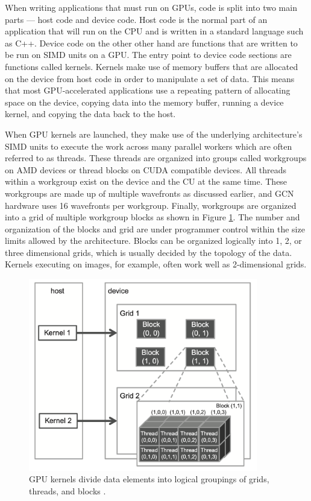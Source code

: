 When writing applications that must run on GPUs, code is split into two main parts — host code and device code. Host code is the normal part of an application that will run on the CPU and is written in a standard language such as C++. Device code on the other other hand are functions that are written to be run on SIMD units on a GPU. The entry point to device code sections are functions called kernels. Kernels make use of memory buffers that are allocated on the device from host code in order to manipulate a set of data. This means that most GPU-accelerated applications use a repeating pattern of allocating space on the device, copying data into the memory buffer, running a device kernel, and copying the data back to the host. 

\quad When GPU kernels are launched, they make use of the underlying architecture’s SIMD units to execute the work across many parallel workers which are often referred to as threads. These threads are organized into groups called workgroups on AMD devices or thread blocks on CUDA compatible devices. All threads within a workgroup exist on the device and the CU at the same time. These workgroups are made up of multiple wavefronts as discussed earlier, and GCN hardware uses 16 wavefronts per workgroup. Finally, workgroups are organized into a grid of multiple workgroup blocks as shown in Figure \ref{gridthreadblock}. The number and organization of the blocks and grid are under programmer control within the size limits allowed by the architecture. Blocks can be organized logically into 1, 2, or three dimensional grids, which is usually decided by the topology of the data. Kernels executing on images, for example, often work well as 2-dimensional grids. 

\begin{figure}[hbtp]
\includegraphics[width=100mm]{figures/gridblockthread.png}
\centering
\caption{GPU kernels divide data elements into logical groupings of grids, threads, and blocks \cite{greenBook}.}
\label{gridthreadblock}
\end{figure}

